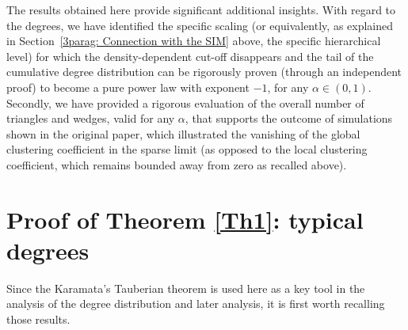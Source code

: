 \documentclass[11pt, reqno]{amsart}
\numberwithin{equation}{section}
\theoremstyle{plain} %
\theoremstyle{definition} %
\begin{document}
The results obtained here provide significant additional insights.
With regard to the degrees, we have identified the specific scaling (or equivalently, as explained in Section~\ref{3parag: Connection with the SIM} above, the specific hierarchical level) for which the density-dependent cut-off disappears and the tail of the cumulative degree distribution can be rigorously proven (through an independent proof) to become a pure power law with exponent $-1$, for any $\alpha \in (0,1)$.
Secondly, we have provided a rigorous evaluation of the overall number of triangles and wedges, valid for any $\alpha$, that supports the outcome of  simulations shown in the original paper, 
which illustrated the vanishing of the global clustering coefficient in the sparse limit 
(as opposed to the local clustering coefficient, which remains bounded away from zero as recalled above).






\section{Proof of Theorem \ref{Th1}: typical degrees}\label{Proof: Th 1}
Since the Karamata's Tauberian theorem is used here as a key tool in the analysis of the degree distribution and later analysis, it is first worth recalling those results. 
\end{document}

